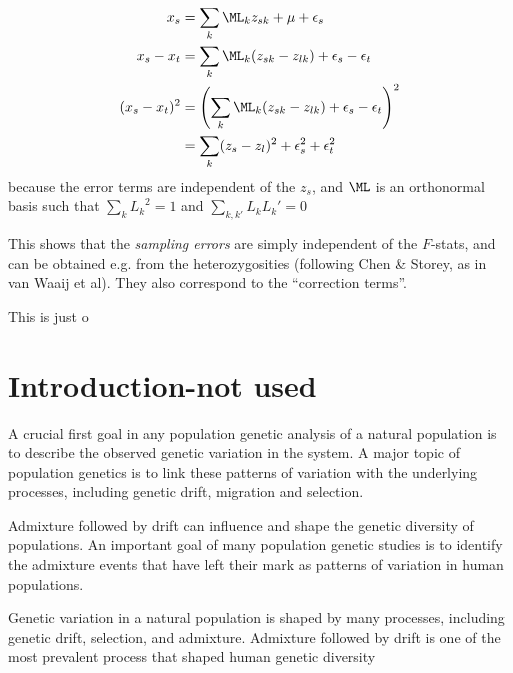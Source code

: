 \documentclass[12pt, letterpaper]{article}
\begin{document}
\begin{align}
x_{s} &= \sum_k \ML_k z_{sk} + \mu + \epsilon_s\\
x_{s} - x_{t} &= \sum_k \ML_k (z_{sk} - z_{lk}) +  \epsilon_s -  \epsilon_t\\
(x_{s} - x_{t})^2 &=  \left(\sum_k \ML_k (z_{sk} - z_{lk} ) +  \epsilon_s - \epsilon_t\right)^2\\
&= \sum_k(z_s - z_l)^2 + \epsilon_s^2 + \epsilon_t^2
\end{align}
because the error terms are independent of the $z_s$, and $\ML$ is an orthonormal basis such that $\sum_k {L_k}^2=1$ and $\sum_{k, k'} {L_k L_k'} = 0$

This shows that the \emph{sampling errors} are simply independent of the $F$-stats, and can be obtained e.g. from the heterozygosities (following Chen \& Storey, as in van Waaij et al). They also correspond to the ``correction terms''.

This is just o



\section{Introduction-not used }
A crucial first goal in any population genetic analysis of a natural population is to describe the observed genetic variation in the system. A major topic of population genetics is to link these patterns of variation with the underlying processes, including genetic drift, migration and selection.

Admixture followed by drift can influence and shape the genetic diversity of populations. An important goal of many population genetic studies is to identify the admixture events that have left their mark as patterns of variation in human populations. 

Genetic variation in a natural population is shaped by many processes, including genetic drift, selection, and admixture. Admixture followed by drift is one of the most prevalent process that shaped human genetic diversity 





\end{document}
